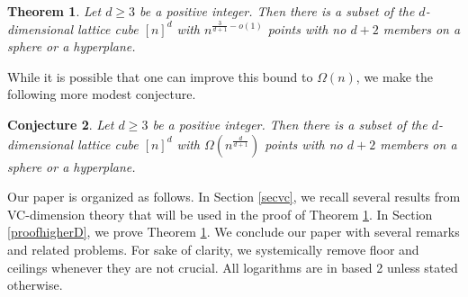 \documentclass[11pt]{article}
\theoremstyle{plain}
\newtheorem{theorem}{Theorem}[section]
\newtheorem{conjecture}[theorem]{Conjecture}
\theoremstyle{definition}
\theoremstyle{remark}
\begin{document}
\begin{theorem}\label{higherD} Let $d \geq 3$ be a positive integer. Then there is a subset of the $d$-dimensional lattice cube $[n]^d$ with $n^{\frac{3}{d+1} -o(1)}$ points with no $d+2$ members on a sphere or a hyperplane.
\end{theorem}

%
%
While it is possible that one can improve this bound to $\Omega(n)$, we make the following more modest conjecture.
%
\begin{conjecture}\label{mainconj}
    Let $d \geq 3$ be a positive integer. Then there is a subset of the $d$-dimensional lattice cube $[n]^d$ with $\Omega(n^{\frac{d}{d + 1}})$ points with no $d+2$ members on a sphere or a hyperplane.
\end{conjecture}
%
%
%
%
Our paper is organized as follows.  In Section \ref{secvc}, we recall several results from VC-dimension theory that will be used in the proof of Theorem \ref{higherD}.  In Section \ref{proofhigherD}, we prove Theorem \ref{higherD}.   We conclude our paper with several remarks and related problems.  For sake of clarity, we systemically remove floor and ceilings whenever they are not crucial.  All logarithms are in based 2 unless stated otherwise.  
%
\end{document}
